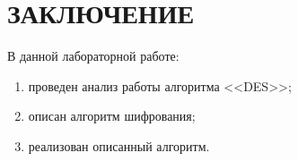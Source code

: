 \chapter*{ЗАКЛЮЧЕНИЕ}

В данной лабораторной работе:

\begin{enumerate}[label=---]
    \item проведен анализ работы алгоритма <<DES>>;
    \item описан алгоритм шифрования;
    \item реализован описанный алгоритм.
\end{enumerate}
